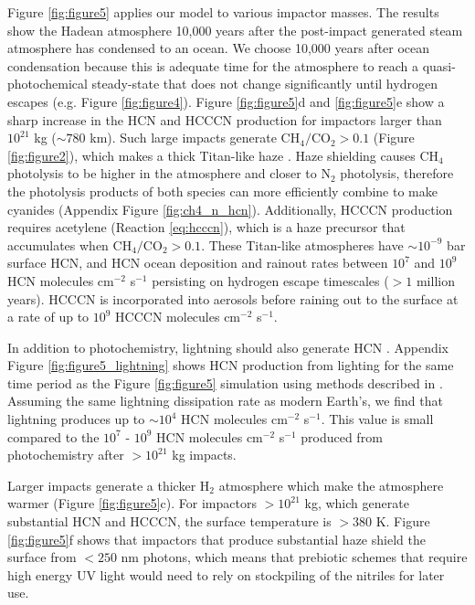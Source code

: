 Figure \ref{fig:figure5} applies our model to various impactor masses. The results show the Hadean atmosphere 10,000 years after the post-impact generated steam atmosphere has condensed to an ocean. We choose 10,000 years after ocean condensation because this is adequate time for the atmosphere to reach a quasi-photochemical steady-state that does not change significantly until hydrogen escapes (e.g. Figure \ref{fig:figure4}). Figure \ref{fig:figure5}d and \ref{fig:figure5}e show a sharp increase in the HCN and HCCCN production for impactors larger than $10^{21}$ kg ($\sim 780$ km). Such large impacts generate $\mathrm{CH_4}/\mathrm{CO_2} > 0.1$ (Figure \ref{fig:figure2}), which makes a thick Titan-like haze \citep{Trainer_2006}. Haze shielding causes CH$_4$ photolysis to be higher in the atmosphere and closer to N$_2$ photolysis, therefore the photolysis products of both species can more efficiently combine to make cyanides (Appendix Figure \ref{fig:ch4_n_hcn}). Additionally, HCCCN production requires acetylene (Reaction \ref{eq:hcccn}), which is a haze precursor that accumulates when $\mathrm{CH_4}/\mathrm{CO_2} > 0.1$. These Titan-like atmospheres have $\sim 10^{-9}$ bar surface HCN, and HCN ocean deposition and rainout rates between $10^7$ and $10^9$ HCN molecules cm$^{-2}$ s$^{-1}$ persisting on hydrogen escape timescales ($> 1$ million years). HCCCN is incorporated into aerosols before raining out to the surface at a rate of up to $10^9$ HCCCN molecules cm$^{-2}$ s$^{-1}$.

In addition to photochemistry, lightning should also generate HCN \citep{Chameides_1981,Stribling_1987}. Appendix Figure \ref{fig:figure5_lightning} shows HCN production from lighting for the same time period as the Figure \ref{fig:figure5} simulation using methods described in \citet{Chameides_1981}. Assuming the same lightning dissipation rate as modern Earth's, we find that lightning produces up to $\sim 10^{4}$ HCN molecules cm$^{-2}$ s$^{-1}$. This value is small compared to the $10^{7}$ - $10^{9}$ HCN molecules cm$^{-2}$ s$^{-1}$ produced from photochemistry after $> 10^{21}$ kg impacts.

Larger impacts generate a thicker H$_2$ atmosphere which make the atmosphere warmer (Figure \ref{fig:figure5}c). For impactors $> 10^{21}$ kg, which generate substantial HCN and HCCCN, the surface temperature is $> 380$ K. Figure \ref{fig:figure5}f shows that impactors that produce substantial haze shield the surface from $< 250$ nm photons, which means that prebiotic schemes that require high energy UV light \citep[e.g.,][]{Patel_2015} would need to rely on stockpiling of the nitriles for later use. 

